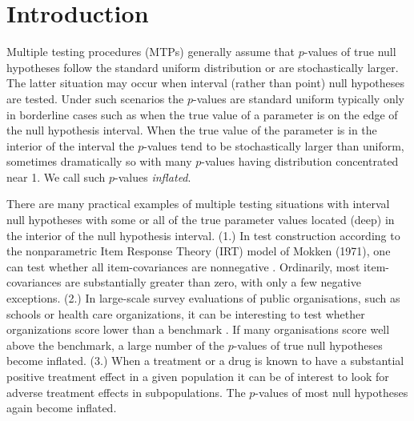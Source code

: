 \documentclass {imsart}
\renewcommand{\emph}[1]{\textsl{#1}}
\begin{document}
\begin{frontmatter}
\begin{keyword}[class=MSC]
\end{keyword}

\begin{keyword}
\end{keyword}

\end{frontmatter}


\section{Introduction}

Multiple testing procedures (MTPs) generally assume that $p$-values of true null hypotheses follow the standard uniform distribution or are stochastically larger. The latter situation may occur when interval (rather than point) null hypotheses are tested. Under such scenarios the $p$-values are standard uniform typically only in borderline cases such as when the true value of a parameter is on the edge of the null hypothesis interval. When the true value of the parameter is in the interior of the interval the $p$-values tend to be stochastically larger than uniform, sometimes dramatically so with many $p$-values having distribution concentrated near 1. We call such $p$-values \emph{inflated}.

There are many practical examples of multiple testing situations with interval null hypotheses with some or all of the true parameter values located (deep) in the interior of the null hypothesis interval. (1.) In test construction according to the nonparametric Item Response Theory (IRT) model of Mokken (1971), one can test whether all item-covariances are nonnegative \citep{Mokken1971, Rosenbaum1984, HR1986, JE1997}. Ordinarily, most item-covariances are substantially greater than zero, with only a few negative exceptions.
(2.) In large-scale survey evaluations of public organisations, such as schools or health care organizations, it can be interesting to test whether organizations score lower than a benchmark \citep{Normand2007, Ellis2013}. If many organisations score well above the benchmark, a large number of the $p$-values of true null hypotheses become inflated. (3.) When a treatment or a drug is known to have a substantial positive treatment effect in a given population it can be of interest to look for adverse treatment effects in subpopulations. The $p$-values of most null hypotheses again become inflated.
\end{document}
